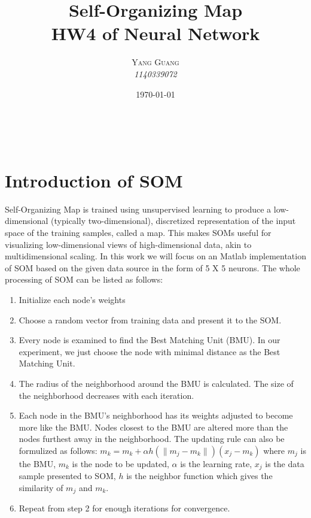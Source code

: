 \documentclass[a4paper, 11pt]{article} %
\title{\textbf{Self-Organizing Map}\\ %
HW4 of Neural Network} %
\author{\textsc{Yang Guang} %
\\{\textit{1140339072}}} %
\date{\today} %
\makeatletter
\renewcommand{\maketitle}{ %
\begin{flushright} %
{\LARGE\@title} %

\vspace{50pt} %

{\large\@author} %
\\\@date %

\vspace{40pt} %
\end{flushright}
}
\makeatother
\begin{document}
\maketitle %







\section*{Introduction of SOM}

Self-Organizing Map is trained using unsupervised learning to produce a low-dimensional (typically two-dimensional), discretized representation of the input space of the training samples, called a map. This makes SOMs useful for visualizing low-dimensional views of high-dimensional data, akin to multidimensional scaling. In this work we will focus on an Matlab implementation of SOM based on the given data source in the form of 5 X 5 neurons.
The whole processing of SOM can be listed as follows:
\begin{enumerate}
	\item Initialize each node's weights 
	\item Choose a random vector from training data and present it to the SOM.
	\item Every node is examined to find the Best Matching Unit (BMU). In our experiment, we just choose the node with minimal distance as the Best Matching Unit.
	\item The radius of the neighborhood around the BMU is calculated. The size of the neighborhood decreases with each iteration.
	\item Each node in the BMU's neighborhood has its weights adjusted to become more like the BMU. Nodes closest to the BMU are altered more than the nodes furthest away in the neighborhood. The updating rule can also be formulized as follows:
		$m_k = m_k + \alpha h(\parallel m_j - m_k \parallel)(x_j - m_k)$
	where $m_j$ is the BMU, $m_k$ is the node to be updated, $\alpha$ is the learning rate, $x_j$ is the data sample presented to SOM, $h$ is the neighbor function which gives the similarity of $m_j$ and $m_k$.
	\item Repeat from step 2 for enough iterations for convergence. 
\end{enumerate}
\end{document}
